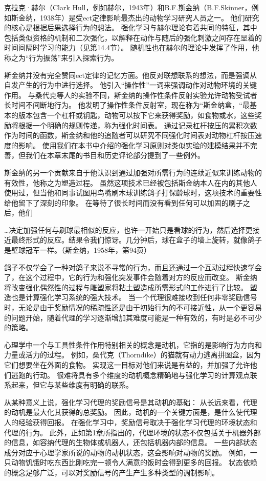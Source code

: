 {克拉克·赫尔（Clark Hull，例如赫尔，1943年）和B.F.斯金纳（B.F.Skinner，例如斯金纳，1938年）是受ect定律影响最杰出的动物学习研究人员之一。
他们研究的核心是根据后果选择行为的想法。
强化学习与赫尔理论有着共同的特征，其中包括类似资格的机制和二次强化，以解释在动作与随后的强化刺激之间存在显着的时间间隔时学习的能力（见第14.4节）。
随机性也在赫尔的理论中发挥了作用，他称之为“行为振荡”来引入探索行为。


斯金纳并没有完全赞同ect定律的记忆方面。他反对联想联系的想法，而是强调从自发产生的行为中进行选择。
他引入“操作性”一词来强调动作对动物环境的关键作用。
与桑代克等人的实验不同，斯金纳的操作性条件反射实验允许动物受试者长时间不间断地行为。
他发明了操作性条件反射室，现在称为“斯金纳盒，“最基本的版本包含一个杠杆或钥匙，动物可以按下它来获得奖励，如食物或水，这些奖励将根据一个明确的规则传递，称为强化时间表。
通过记录杠杆按压的累积次数作为时间的函数，斯金纳和他的追随者可以研究不同强化时间表对动物杠杆按压速度的影响。
使用我们在本书中介绍的强化学习原则对类似实验的建模结果并不完善，但我们在本章末尾的书目和历史评论部分提到了一些例外。


斯金纳的另一个贡献来自于他认识到通过加强对所需行为的连续近似来训练动物的有效性，他称之为塑造过程。
虽然这项技术已经被包括斯金纳本人在内的其他人使用过，但当他和同事试图用鸟嘴刷木球训练鸽子打保龄球时，这项技术的重要性给他留下了深刻的印象。
在等待了很长时间而没有看到任何可以加固的刷子之后，他们


…决定加强任何与刷球最相似的反应，也许一开始只是看球的行为，然后选择更接近最终形式的反应。结果令我们惊讶。几分钟后，球在盒子的墙上旋转，就像鸽子是壁球冠军一样。（斯金纳，1958年，第94页）


鸽子不仅学会了一种对鸽子来说不寻常的行为，而且还通过一个互动过程快速学会了，在这个过程中，它的行为和强化突发事件会随着对方的反应而改变。
斯金纳将改变强化偶然性的过程与雕塑家将粘土塑造成所需形式的工作进行了比较。
塑造也是计算强化学习系统的强大技术。
当一个代理很难接收到任何非零奖励信号时，无论是由于奖励情况的稀疏性还是由于初始行为的不可接近性，从一个更容易的问题开始，随着代理的学习逐渐增加其难度可能是一种有效的，有时是必不可少的策略。


心理学中一个与工具性条件作用特别相关的概念是动机，它指的是影响行为方向和力量或活力的过程。
例如，桑代克（Thorndike）的猫就有动力逃离拼图盒，因为它们想要坐在外面的食物。
实现这一目标对他们来说是有益的，并加强了允许他们逃跑的行动。
很难将具有多个维度的动机概念精确地与强化学习的计算观点联系起来，但它与某些维度有明确的联系。


从某种意义上说，强化学习代理的奖励信号是其动机的基础：
从长远来看，代理的动机是最大化其获得的总奖励。
因此，动机的一个关键方面是，是什么使代理人的经验获得回报。
在强化学习中，奖励信号取决于强化学习代理的环境状态和代理的行为。
此外，正如第1章所指出的，代理环境的状态不仅包括关于机器外部的信息，如容纳代理的生物体或机器人，还包括机器内部的信息。
一些内部状态成分对应于心理学家所说的动物的动机状态，这会影响对动物的奖励。
例如，一只动物饥饿时吃东西比刚吃完一顿令人满意的饭时会得到更多的回报。
状态依赖的概念足够广泛，可以对奖励信号的产生产生多种类型的调制影响。


}
